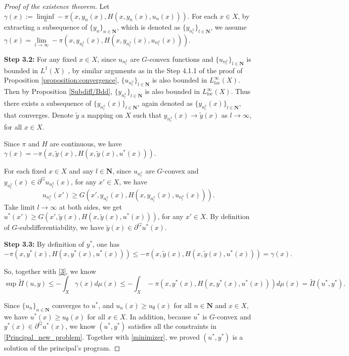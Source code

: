 \documentclass[a4paper, 11pt]{amsart}
\numberwithin{equation}{section}
\theoremstyle{plain}
\theoremstyle{definition}
\theoremstyle{remark}
\newcommand{\N}{\mathbf{N}}
\begin{document}
\begin{proof}[Proof of the existence theorem]
Let $\gamma(x):=\liminf\limits_{n} - \pi(x, y_n(x), H(x,y_n(x),u_n(x)))$. 
For each $x\in X$, by extracting a subsequence of $\{y_n\}_{n\in \N}$, which is denoted as $\{y_{n^x_l}\}_{l\in \N}$, we assume $\gamma(x) = \lim\limits_{l \rightarrow \infty} - \pi(x, y_{n_l^x}(x), H(x,y_{n_l^x}(x),u_{n_l^x}(x)))$. \medskip
	
	{\bf Step 3.2: } 	For any fixed $x \in X$, since $u_{n_l^x}$ are $G$-convex functions and $\{u_{n_l^x}\}_{l\in \N}$ is bounded in $L^1(X)$%
	, by %
	similar arguments as in the Step 4.1.1 of the proof of Proposition \ref{proposition:convergence}, $\{u_{n_l^x}\}_{l\in \N}$ is also bounded in $L_{loc}^{\infty}(X)$. Then by Proposition \ref{Subdiff/Bdd}, $\{y_{n_l^x}\}_{l\in \N}$ is also bounded in $L_{loc}^{\infty}(X)$. Thus there exists a subsequence of $\{y_{n_l^x}(x)\}_{l\in \N}$, again denoted as $\{y_{n_l^x}(x)\}_{l\in \N}$, that converges. Denote $\tilde{y}$ a mapping on $X$ such that $y_{n_l^x}(x) \longrightarrow \tilde{y}(x)$ as $l \longrightarrow \infty$, for all $x\in X$.\medskip
	
	Since $\pi$ and $H$ are continuous, we have $ \gamma(x)= - \pi(x, \tilde{y}(x), H(x,\tilde{y}(x),u^*(x)))$.\medskip
	
	For each fixed $x\in X$ and any $l \in \N$, since $u_{n_l^x}$ are $G$-convex and $y_{n_l^x}(x) \in \partial^G u_{n_l^x}(x)$, for any $x' \in X$, we have $$u_{n_l^x}(x')\ge G(x', y_{n_l^x}(x),H(x,y_{n_l^x}(x),u_{n_l^x}(x))).$$ 
	Take limit $l \longrightarrow \infty$ at both sides, we get $u^*(x')\ge G(x', \tilde{y}(x),H(x,\tilde{y}(x),u^*(x)))$, for any $x'\in X$. By definition of $G$-subdifferentiability, we have $\tilde{y}(x)\in \partial^Gu^*(x)$. \medskip





{\bf Step 3.3: } By definition of $y^*$, one has $$ -\pi(x, y^*(x), H(x,y^*(x),u^*(x)))\le   -\pi(x, \tilde{y}(x), H(x,\tilde{y}(x),u^*(x))) = \gamma(x).$$
	
So, together with \eqref{3}, we know 
\begin{equation}\label{minimizer}
	\sup \tilde{\Pi}(u,y) \le - \int_{X}  \gamma(x) d\mu(x) \le - \int_{X}  - \pi(x, y^*(x), H(x,y^*(x),u^*(x))) d\mu(x) = \tilde{\Pi}(u^*,y^*).
\end{equation}


Since $\{u_n\}_{n\in \N}$ converges to $u^*$, and $u_n(x)\ge u_{\emptyset}(x)$ for all $n\in \N$ and $x \in X$, we have $u^*(x)\ge u_{\emptyset}(x)$ for all $x \in X$. In addition, because $u^*$ is $G$-convex and $y^*(x) \in \partial^G u^*(x)$, we know $(u^*, y^*)$ satisfies all the constraints in \eqref{Principal_new_problem}. Together with \eqref{minimizer}, we proved $(u^*,y^*)$ is a solution of the principal's program.
\end{proof}
\end{document}
